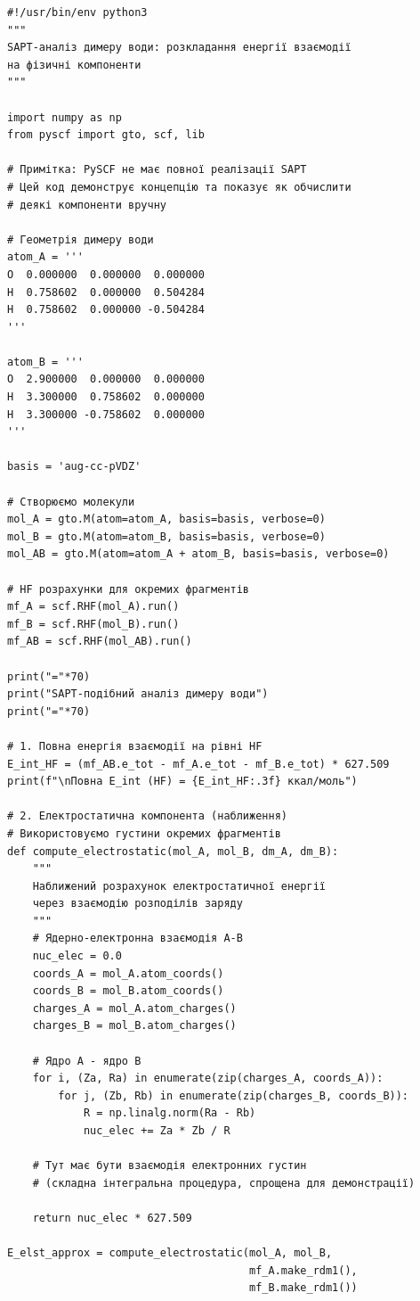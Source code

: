 \begin{verbatim}
#!/usr/bin/env python3
"""
SAPT-аналіз димеру води: розкладання енергії взаємодії
на фізичні компоненти
"""

import numpy as np
from pyscf import gto, scf, lib

# Примітка: PySCF не має повної реалізації SAPT
# Цей код демонструє концепцію та показує як обчислити
# деякі компоненти вручну

# Геометрія димеру води
atom_A = '''
O  0.000000  0.000000  0.000000
H  0.758602  0.000000  0.504284
H  0.758602  0.000000 -0.504284
'''

atom_B = '''
O  2.900000  0.000000  0.000000
H  3.300000  0.758602  0.000000
H  3.300000 -0.758602  0.000000
'''

basis = 'aug-cc-pVDZ'

# Створюємо молекули
mol_A = gto.M(atom=atom_A, basis=basis, verbose=0)
mol_B = gto.M(atom=atom_B, basis=basis, verbose=0)
mol_AB = gto.M(atom=atom_A + atom_B, basis=basis, verbose=0)

# HF розрахунки для окремих фрагментів
mf_A = scf.RHF(mol_A).run()
mf_B = scf.RHF(mol_B).run()
mf_AB = scf.RHF(mol_AB).run()

print("="*70)
print("SAPT-подібний аналіз димеру води")
print("="*70)

# 1. Повна енергія взаємодії на рівні HF
E_int_HF = (mf_AB.e_tot - mf_A.e_tot - mf_B.e_tot) * 627.509
print(f"\nПовна E_int (HF) = {E_int_HF:.3f} ккал/моль")

# 2. Електростатична компонента (наближення)
# Використовуємо густини окремих фрагментів
def compute_electrostatic(mol_A, mol_B, dm_A, dm_B):
    """
    Наближений розрахунок електростатичної енергії
    через взаємодію розподілів заряду
    """
    # Ядерно-електронна взаємодія A-B
    nuc_elec = 0.0
    coords_A = mol_A.atom_coords()
    coords_B = mol_B.atom_coords()
    charges_A = mol_A.atom_charges()
    charges_B = mol_B.atom_charges()

    # Ядро A - ядро B
    for i, (Za, Ra) in enumerate(zip(charges_A, coords_A)):
        for j, (Zb, Rb) in enumerate(zip(charges_B, coords_B)):
            R = np.linalg.norm(Ra - Rb)
            nuc_elec += Za * Zb / R

    # Тут має бути взаємодія електронних густин
    # (складна інтегральна процедура, спрощена для демонстрації)

    return nuc_elec * 627.509

E_elst_approx = compute_electrostatic(mol_A, mol_B,
                                      mf_A.make_rdm1(),
                                      mf_B.make_rdm1())


\end{verbatim}
